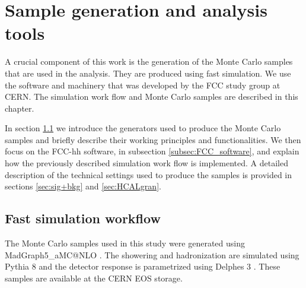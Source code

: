
\chapter{Sample generation and analysis tools}
\label{chapter:tools}

A crucial component of this work is the generation of the Monte Carlo samples that are used in the analysis. They are produced using fast simulation. We use the software and machinery that was developed by the FCC study group at CERN. The simulation work flow and Monte Carlo samples are described in this chapter.

In section \ref{sec:workflow} we introduce the generators used to produce the Monte Carlo samples and briefly describe their working principles and functionalities. We then focus on the FCC-hh software, in subsection \ref{subsec:FCC_software}, and explain how the previously described simulation work flow is implemented. A detailed description of the technical settings used to produce the samples is provided in sections \ref{sec:sig+bkg} and \ref{sec:HCALgran}.


\section{Fast simulation workflow}
\label{sec:workflow}


The Monte Carlo samples used in this study were generated using MadGraph5\_aMC@NLO  \cite{MG5}. The showering and hadronization are simulated using Pythia 8 \cite{Pythia8} and the detector response is parametrized using Delphes 3 \cite{Delphes}. These samples are available at the CERN EOS storage. 

